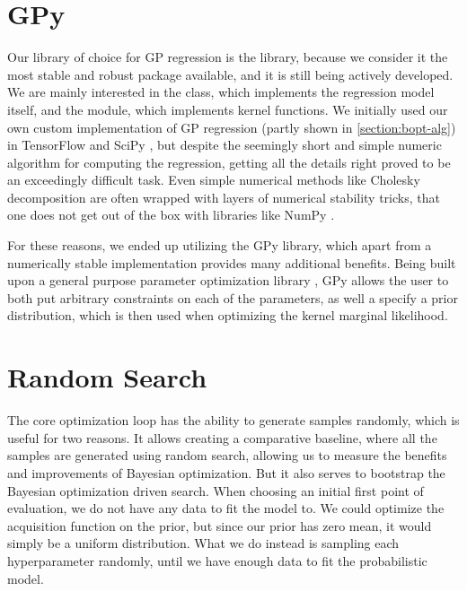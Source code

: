 \section{GPy}
\label{section:gpy}

Our library of choice for GP regression is the \cite{gpy2014} library, because we consider it the most stable and robust package available, and it is still being actively developed. We are mainly interested in the  class, which implements the regression model itself, and the  module, which implements kernel functions. We initially used our own custom implementation of GP regression (partly shown in \autoref{section:bopt-alg}) in TensorFlow \citep{tensorflow2015-whitepaper} and SciPy \citep{scipy}, but despite the seemingly short and simple numeric algorithm for computing the regression, getting all the details right proved to be an exceedingly difficult task. Even simple numerical methods like Cholesky decomposition are often wrapped with layers of numerical stability tricks, that one does not get out of the box with libraries like NumPy \citep{numpy}.

For these reasons, we ended up utilizing the GPy library, which apart from a numerically stable implementation provides many additional benefits. Being built upon a general purpose parameter optimization library \cite{paramz}, GPy allows the user to both put arbitrary constraints on each of the parameters, as well a specify a prior distribution, which is then used when optimizing the kernel marginal likelihood.

\section{Random Search}

The core optimization loop has the ability to generate samples randomly, which is useful for two reasons. It allows creating a comparative baseline, where all the samples are generated using random search, allowing us to measure the benefits and improvements of Bayesian optimization. But it also serves to bootstrap the Bayesian optimization driven search. When choosing an initial first point of evaluation, we do not have any data to fit the model to. We could optimize the acquisition function on the prior, but since our prior has zero mean, it would simply be a uniform distribution. What we do instead is sampling each hyperparameter randomly, until we have enough data to fit the probabilistic model.

